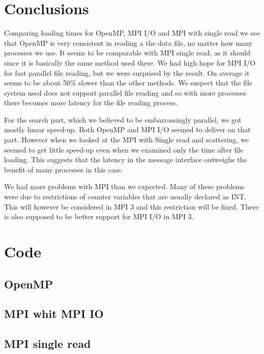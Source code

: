 \documentclass[a4paper,10pt]{article}
\begin{document}
\clearpage
\section{Conclusions}

Comparing loading times for OpenMP, 
MPI I/O and MPI with single read we see that OpenMP is very consistent in reading a the data file, 
no matter how many processes we use. 
It seems to be comparable with MPI single read, 
as it should since it is basically the same method used there.
We had high hope for MPI I/O for fast parallel file reading, 
but we were surprised by the result. 
On average it seems to be about 50\% slower than the other methods. 
We suspect that the file system used does not support parallel file 
reading and so with more processes there becomes more latency for the file reading process.

For the search part, which we believed to be embarrassingly parallel, 
we got mostly linear speed-up. Both OpenMP and MPI I/O seemed to deliver on that part. 
However when we looked at the MPI with Single read and scattering, 
we seemed to get little speed-up even when we examined only the time after file loading. 
This suggests that the latency in the message interface outweighs the benefit of many 
processes in this case.

We had more problems with MPI than we expected. 
Many of these problems were due to restrictions of counter variables that are usually declared as INT. 
This will however be considered in MPI 3 and this restriction will be fixed. 
There is also supposed to be better support for MPI I/O in MPI 3.

\appendix
\section{Code}
%    
  \subsection{OpenMP}
       
  \subsection{MPI whit MPI IO}
     
    \subsection{MPI single read}
    
\end{document}
